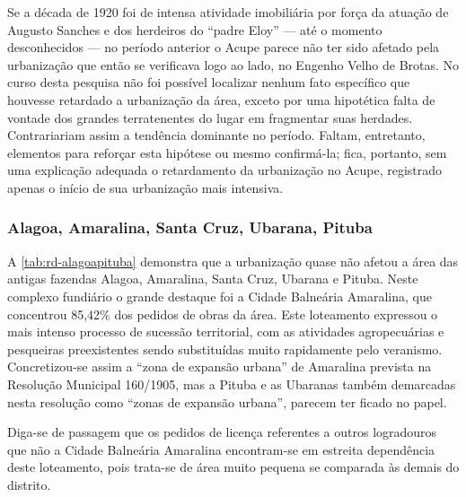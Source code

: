 



Se a década de 1920 foi de intensa atividade imobiliária por força da atuação de Augusto Sanches e dos herdeiros do ``padre Eloy'' --- até o momento desconhecidos --- no período anterior o Acupe parece não ter sido afetado pela urbanização que então se verificava logo ao lado, no Engenho Velho de Brotas. No curso desta pesquisa não foi possível localizar nenhum fato específico que houvesse retardado a urbanização da área, exceto por uma hipotética falta de vontade dos grandes terratenentes do lugar em fragmentar suas herdades. Contrariariam assim a tendência dominante no período. Faltam, entretanto, elementos para reforçar esta hipótese ou mesmo confirmá-la; fica, portanto, sem uma explicação adequada o retardamento da urbanização no Acupe, registrado apenas o início de sua urbanização mais intensiva.

\subsubsection{Alagoa, Amaralina, Santa Cruz, Ubarana, Pituba}\label{subsec:alaamascup}


A \autoref{tab:rd-alagoapituba} demonstra que a urbanização quase não afetou a área das antigas fazendas Alagoa, Amaralina, Santa Cruz, Ubarana e Pituba. Neste complexo fundiário o grande destaque foi a Cidade Balneária Amaralina, que concentrou 85,42\% dos pedidos de obras da área. Este loteamento expressou o mais intenso processo de sucessão territorial, com as atividades agropecuárias e pesqueiras preexistentes sendo substituídas muito rapidamente pelo veranismo. Concretizou-se assim a ``zona de expansão urbana'' de Amaralina prevista na Resolução Municipal 160/1905, mas a Pituba e as Ubaranas também demarcadas nesta resolução como ``zonas de expansão urbana'', parecem ter ficado no papel.





Diga-se de passagem que os pedidos de licença referentes a outros logradouros que não a Cidade Balneária Amaralina encontram-se em estreita dependência deste loteamento, pois trata-se de área muito pequena se comparada às demais do distrito.

